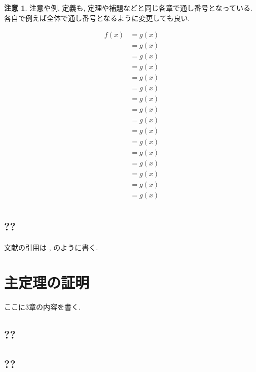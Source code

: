 \documentclass[12pt,a4j,twoside]{jreport}
\numberwithin{equation}{chapter}
\theoremstyle{definition} %
\newtheorem{rem}[thm]{注意}
\begin{document}
\begin{rem}
注意や例, 定義も, 定理や補題などと同じ各章で通し番号となっている. 
各自で例えば全体で通し番号となるように変更しても良い. 
\end{rem}


\begin{align*}
f(x)
&= g(x) \\
&= g(x) \\
&= g(x) \\
&= g(x) \\&= g(x) \\
&= g(x) \\&= g(x) \\
&= g(x) \\&= g(x) \\
&= g(x) \\&= g(x) \\
&= g(x) \\&= g(x) \\
&= g(x) \\&= g(x) \\
&= g(x) \\
\end{align*}

\section{??}

文献の引用は \cite{Gmv:green}, \cite{APS} のように書く. 

\chapter{主定理の証明}

ここに3章の内容を書く. 

\section{??}

\section{??}
\end{document}
